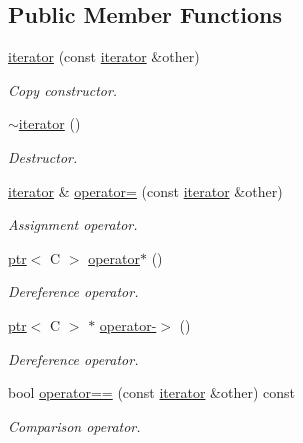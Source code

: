 \subsection*{Public Member Functions}
\begin{DoxyCompactItemize}
\item 
\hyperlink{classdbo_1_1collection_1_1iterator_ab34c352dc47e09471b7873d3a3dc34ae}{iterator} (const \hyperlink{classdbo_1_1collection_1_1iterator}{iterator} \&other)
\begin{DoxyCompactList}\small\item\em Copy constructor. \end{DoxyCompactList}\item 
\hyperlink{classdbo_1_1collection_1_1iterator_a01a082d5caedffa845931334d1828b6f}{$\sim$iterator} ()
\begin{DoxyCompactList}\small\item\em Destructor. \end{DoxyCompactList}\item 
\hyperlink{classdbo_1_1collection_1_1iterator}{iterator} \& \hyperlink{classdbo_1_1collection_1_1iterator_a8e934c72cab4003c8cdfc8cc5b959e7a}{operator=} (const \hyperlink{classdbo_1_1collection_1_1iterator}{iterator} \&other)
\begin{DoxyCompactList}\small\item\em Assignment operator. \end{DoxyCompactList}\item 
\hyperlink{classdbo_1_1ptr}{ptr}$<$ C $>$ \hyperlink{classdbo_1_1collection_1_1iterator_ad3e67a51a801ce5e81ce7581d3813208}{operator$\ast$} ()
\begin{DoxyCompactList}\small\item\em Dereference operator. \end{DoxyCompactList}\item 
\hyperlink{classdbo_1_1ptr}{ptr}$<$ C $>$ $\ast$ \hyperlink{classdbo_1_1collection_1_1iterator_af89d7e4401b7c3689d835a7279b3b896}{operator-\/$>$} ()
\begin{DoxyCompactList}\small\item\em Dereference operator. \end{DoxyCompactList}\item 
bool \hyperlink{classdbo_1_1collection_1_1iterator_af63bc9779f8e27ee1469f287b758016b}{operator==} (const \hyperlink{classdbo_1_1collection_1_1iterator}{iterator} \&other) const 
\begin{DoxyCompactList}\small\item\em Comparison operator. \end{DoxyCompactList}\item 

\end{DoxyCompactItemize}
